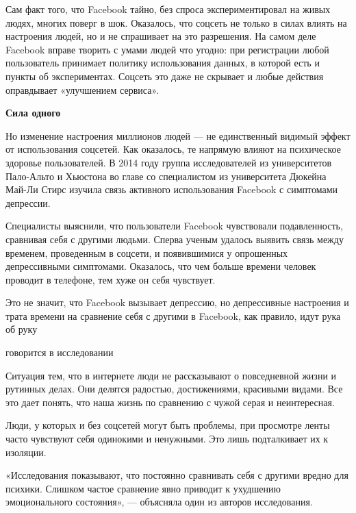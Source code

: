 Сам факт того, что Facebook тайно, без спроса экспериментировал на живых людях, многих поверг в шок. Оказалось, что соцсеть не только в силах влиять на настроения людей, но и не спрашивает на это разрешения. На самом деле Facebook вправе творить с умами людей что угодно: при регистрации любой пользователь принимает политику использования данных, в которой есть и пункты об экспериментах. Соцсеть это даже не скрывает и любые действия оправдывает «улучшением сервиса».

\textbf{Сила одного}

Но изменение настроения миллионов людей — не единственный видимый эффект от использования соцсетей. Как оказалось, те напрямую влияют на психическое здоровье пользователей. В 2014 году группа исследователей из университетов Пало-Альто и Хьюстона во главе со специалистом из университета Дюкейна Май-Ли Стирс изучила связь активного использования Facebook с симптомами депрессии.

Специалисты выяснили, что пользователи Facebook чувствовали подавленность, сравнивая себя с другими людьми. Сперва ученым удалось выявить связь между временем, проведенным в соцсети, и появившимися у опрошенных депрессивными симптомами. Оказалось, что чем больше времени человек проводит в телефоне, тем хуже он себя чувствует.

\begin{fancyquotes}
    Это не значит, что Facebook вызывает депрессию, но депрессивные настроения и трата времени на сравнение себя с другими в Facebook, как правило, идут рука об руку

    \begin{flushright}
        говорится в исследовании
    \end{flushright}
\end{fancyquotes}

Ситуация  тем, что в интернете люди не рассказывают о повседневной жизни и рутинных делах. Они делятся радостью, достижениями, красивыми видами. Все это дает понять, что наша жизнь по сравнению с чужой серая и неинтересная.

Люди, у которых и без соцсетей могут быть проблемы, при просмотре ленты часто чувствуют себя одинокими и ненужными. Это лишь подталкивает их к изоляции.

«Исследования показывают, что постоянно сравнивать себя с другими вредно для психики. Слишком частое сравнение явно приводит к ухудшению эмоционального состояния», — объясняла один из авторов исследования.

